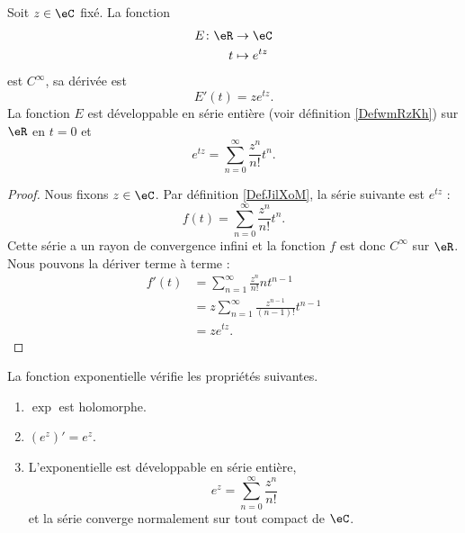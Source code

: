 \begin{proposition}
    Soit \( z\in\eC\) fixé. La fonction
    \begin{equation}
        \begin{aligned}
            E\colon \eR&\to \eC \\
            t&\mapsto  e^{tz} 
        \end{aligned}
    \end{equation}
    est  \(  C^{\infty}\), sa dérivée est 
    \begin{equation}
        E'(t)=z e^{tz}.
    \end{equation}
    La fonction \( E\) est développable en série entière (voir définition \ref{DefwmRzKh}) sur \( \eR\) en \( t=0\) et
    \begin{equation}
        e^{tz}=\sum_{n=0}^{\infty}\frac{ z^n }{ n! }t^n.
    \end{equation}
\end{proposition}

\begin{proof}
    Nous fixons \( z\in \eC\). Par définition \ref{DefJilXoM}, la série suivante est \(  e^{tz}\) :
    \begin{equation}
        f(t)=\sum_{n=0}^{\infty}\frac{ z^n }{ n! }t^n.
    \end{equation}
    Cette série a un rayon de convergence infini et la fonction \( f\) est donc \(  C^{\infty}\) sur \( \eR\). Nous pouvons la dériver terme à terme :
    \begin{subequations}
        \begin{align}
            f'(t)&=\sum_{n=1}^{\infty}\frac{ z^n }{ n! }nt^{n-1}\\
            &=z\sum_{n=1}^{\infty}\frac{ z^{n-1} }{ (n-1)! }t^{n-1}\\
            &=z e^{tz}.
        \end{align}
    \end{subequations}
\end{proof}

\begin{theorem}
    La fonction exponentielle vérifie les propriétés suivantes.
    \begin{enumerate}
        \item
            \( \exp\) est holomorphe.
        \item
            \( (e^z)'=e^z\).
        \item
            L'exponentielle est développable en série entière,
            \begin{equation}
                e^z=\sum_{n=0}^{\infty}\frac{ z^n }{ n! }
            \end{equation}
            et la série converge normalement sur tout compact de \( \eC\).
    \end{enumerate}
\end{theorem}

